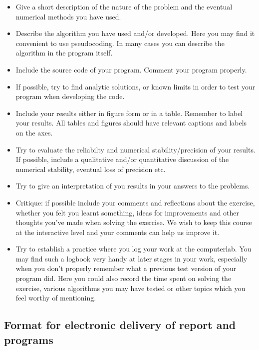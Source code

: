 \documentclass[%
oneside,                 %
final,                   %
10pt]{article}
\begin{document}
\begin{itemize}
  \item Give a short description of the nature of the problem and the eventual  numerical methods you have used.

  \item Describe the algorithm you have used and/or developed. Here you may find it convenient to use pseudocoding. In many cases you can describe the algorithm in the program itself.

  \item Include the source code of your program. Comment your program properly.

  \item If possible, try to find analytic solutions, or known limits in order to test your program when developing the code.

  \item Include your results either in figure form or in a table. Remember to        label your results. All tables and figures should have relevant captions        and labels on the axes.

  \item Try to evaluate the reliabilty and numerical stability/precision of your results. If possible, include a qualitative and/or quantitative discussion of the numerical stability, eventual loss of precision etc.

  \item Try to give an interpretation of you results in your answers to  the problems.

  \item Critique: if possible include your comments and reflections about the  exercise, whether you felt you learnt something, ideas for improvements and  other thoughts you've made when solving the exercise. We wish to keep this course at the interactive level and your comments can help us improve it.

  \item Try to establish a practice where you log your work at the  computerlab. You may find such a logbook very handy at later stages in your work, especially when you don't properly remember  what a previous test version  of your program did. Here you could also record  the time spent on solving the exercise, various algorithms you may have tested or other topics which you feel worthy of mentioning.
\end{itemize}

\noindent
\subsection{Format for electronic delivery of report and programs}
\end{document}
